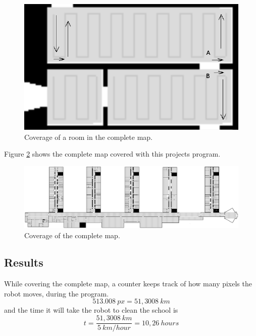 \begin{figure}[H]
\centering
\includegraphics[scale=0.33]{img/room.png}
\caption{Coverage of a room in the complete map.}
\label{fig::room}
\end{figure}

Figure \ref{fig::coverage} shows the complete map covered with this projects program.

\begin{figure}[H]
\centering
\includegraphics[scale=0.33]{img/coverage.png}
\caption{Coverage of the complete map.}
\label{fig::coverage}
\end{figure}

\subsection{Results}
While covering the complete map, a counter keeps track of how many pixels the robot moves, during the program. 
$$513.008\:px=51,3008\:km$$
and the time it will take the robot to clean the school is
$$t=\frac{51,3008\:km}{5\:km/hour}=10,26\:hours$$
